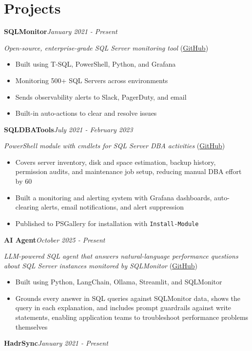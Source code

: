 \documentclass[10pt,a4paper]{article}
\begin{document}
\section{Projects}

\noindent\textbf{SQLMonitor}\hfill \textit{January 2021 - Present}

\textit{Open-source, enterprise-grade SQL Server monitoring tool} (\href{https://github.com/imajaydwivedi/SQLMonitor}{GitHub})
\begin{itemize}
  \item Built using T-SQL, PowerShell, Python, and Grafana
  \item Monitoring 500+ SQL Servers across environments
  \item Sends observability alerts to Slack, PagerDuty, and email
  \item Built-in auto-actions to clear and resolve issues
\end{itemize}
\vspace{14.7pt}
\noindent\textbf{SQLDBATools}\hfill \textit{July 2021 - February 2023}

\textit{PowerShell module with cmdlets for SQL Server DBA activities} (\href{https://github.com/imajaydwivedi/SQLDBATools}{GitHub})
\begin{itemize}
  \item Covers server inventory, disk and space estimation, backup history, permission audits, and maintenance job setup, reducing manual DBA effort by 60%
  \item Built a monitoring and alerting system with Grafana dashboards, auto-clearing alerts, email notifications, and alert suppression
  \item Published to PSGallery for installation with \texttt{Install-Module}
\end{itemize}
\vspace{14.7pt}
\noindent\textbf{AI Agent}\hfill \textit{October 2025 - Present}

\textit{LLM-powered SQL agent that answers natural-language performance questions about SQL Server instances monitored by SQLMonitor} (\href{https://github.com/imajaydwivedi/SQLMonitor/tree/dev/AI-Agent}{GitHub})
\begin{itemize}
  \item Built using Python, LangChain, Ollama, Streamlit, and SQLMonitor
  \item Grounds every answer in SQL queries against SQLMonitor data, shows the query in each explanation, and includes prompt guardrails against write statements, enabling application teams to troubleshoot performance problems themselves
\end{itemize}
\vspace{14.7pt}
\noindent\textbf{HadrSync}\hfill \textit{January 2021 - Present}
\end{document}
